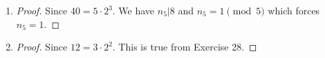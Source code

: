 \begin{exercise}

\end{exercise}

\begin{exercise}
    
\end{exercise}


\begin{exercise}
 \begin{enumerate}[label = (\alph*)]
    \item 
\begin{proof}
Since $40 = 5\cdot 2^3$. We have $n_5 | 8$ and  $n_5 = 1 \pmod{5}$ which forces $n_5 = 1$.
\end{proof}
\item
\begin{proof}
Since $12 = 3\cdot 2^2$. %
This is true from Exercise 28.
\end{proof}
\end{enumerate}
\end{exercise}


